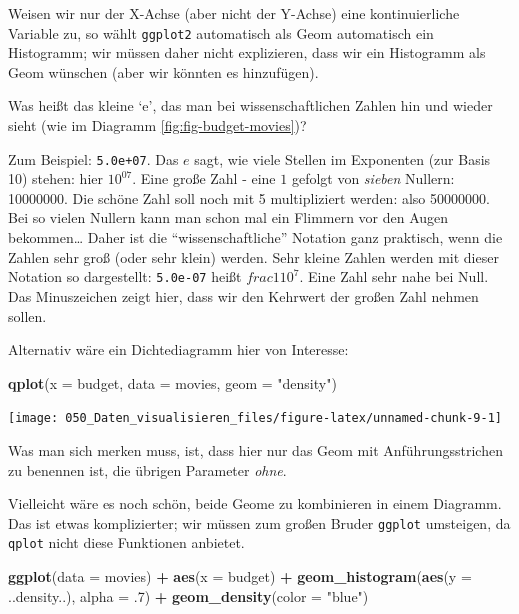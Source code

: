 \documentclass[12pt,ngerman,]{book}
\makeatletter
\newenvironment{Shaded}{\begin{snugshade}}{\end{snugshade}}
\newcommand{\KeywordTok}[1]{\textcolor[rgb]{0.13,0.29,0.53}{\textbf{#1}}}
\newcommand{\DataTypeTok}[1]{\textcolor[rgb]{0.13,0.29,0.53}{#1}}
\newcommand{\DecValTok}[1]{\textcolor[rgb]{0.00,0.00,0.81}{#1}}
\newcommand{\StringTok}[1]{\textcolor[rgb]{0.31,0.60,0.02}{#1}}
\newcommand{\OperatorTok}[1]{\textcolor[rgb]{0.81,0.36,0.00}{\textbf{#1}}}
\newcommand{\NormalTok}[1]{#1}
\newenvironment{kframe}{%
\medskip{}
\setlength{\fboxsep}{.8em}
 \def\at@end@of@kframe{}%
 \ifinner\ifhmode%
  \def\at@end@of@kframe{\end{minipage}}%
  \begin{minipage}{\columnwidth}%
 \fi\fi%
 \def\FrameCommand##1{\hskip\@totalleftmargin \hskip-\fboxsep
 \colorbox{shadecolor}{##1}\hskip-\fboxsep
     \hskip-\linewidth \hskip-\@totalleftmargin \hskip\columnwidth}%
 \MakeFramed {\advance\hsize-\width
   \@totalleftmargin\z@ \linewidth\hsize
   \@setminipage}}%
 {\par\unskip\endMakeFramed%
 \at@end@of@kframe}
\renewenvironment{Shaded}{\begin{kframe}}{\end{kframe}}
\theoremstyle{definition}
\theoremstyle{definition}
\theoremstyle{remark}
\let\BeginKnitrBlock\begin \let\EndKnitrBlock\end
\makeatother
\begin{document}
Weisen wir nur der X-Achse (aber nicht der Y-Achse) eine kontinuierliche
Variable zu, so wählt \texttt{ggplot2} automatisch als Geom automatisch
ein Histogramm; wir müssen daher nicht explizieren, dass wir ein
Histogramm als Geom wünschen (aber wir könnten es hinzufügen).

\BeginKnitrBlock{rmdcaution}
Was heißt das kleine `e', das man bei wissenschaftlichen Zahlen hin und
wieder sieht (wie im Diagramm \ref{fig:fig-budget-movies})?

Zum Beispiel: \texttt{5.0e+07}. Das \(e\) sagt, wie viele Stellen im
Exponenten (zur Basis 10) stehen: hier \(10^{07}\). Eine große Zahl -
eine \(1\) gefolgt von \emph{sieben} Nullern: 10000000. Die schöne Zahl
soll noch mit 5 multipliziert werden: also 50000000. Bei so vielen
Nullern kann man schon mal ein Flimmern vor den Augen bekommen\ldots{}
Daher ist die ``wissenschaftliche'' Notation ganz praktisch, wenn die
Zahlen sehr groß (oder sehr klein) werden. Sehr kleine Zahlen werden mit
dieser Notation so dargestellt: \texttt{5.0e-07} heißt
\(frac{1}{10^7}\). Eine Zahl sehr nahe bei Null. Das Minuszeichen zeigt
hier, dass wir den Kehrwert der großen Zahl nehmen sollen.
\EndKnitrBlock{rmdcaution} Alternativ wäre ein Dichtediagramm hier von
Interesse:

\begin{Shaded}
\begin{Highlighting}[]
\KeywordTok{qplot}\NormalTok{(}\DataTypeTok{x =}\NormalTok{ budget, }\DataTypeTok{data =}\NormalTok{ movies, }\DataTypeTok{geom =} \StringTok{"density"}\NormalTok{)}
\end{Highlighting}
\end{Shaded}

\begin{center}\texttt{[image: 050\_Daten\_visualisieren\_files/figure-latex/unnamed-chunk-9-1]} \end{center}

Was man sich merken muss, ist, dass hier nur das Geom mit
Anführungsstrichen zu benennen ist, die übrigen Parameter \emph{ohne}.

Vielleicht wäre es noch schön, beide Geome zu kombinieren in einem
Diagramm. Das ist etwas komplizierter; wir müssen zum großen Bruder
\texttt{ggplot} umsteigen, da \texttt{qplot} nicht diese Funktionen
anbietet.

\begin{Shaded}
\begin{Highlighting}[]
\KeywordTok{ggplot}\NormalTok{(}\DataTypeTok{data =}\NormalTok{ movies) }\OperatorTok{+}
\StringTok{  }\KeywordTok{aes}\NormalTok{(}\DataTypeTok{x =}\NormalTok{ budget) }\OperatorTok{+}
\StringTok{  }\KeywordTok{geom_histogram}\NormalTok{(}\KeywordTok{aes}\NormalTok{(}\DataTypeTok{y =}\NormalTok{ ..density..), }\DataTypeTok{alpha =}\NormalTok{ .}\DecValTok{7}\NormalTok{) }\OperatorTok{+}
\StringTok{  }\KeywordTok{geom_density}\NormalTok{(}\DataTypeTok{color =} \StringTok{"blue"}\NormalTok{)}
\end{Highlighting}
\end{Shaded}
\end{document}
